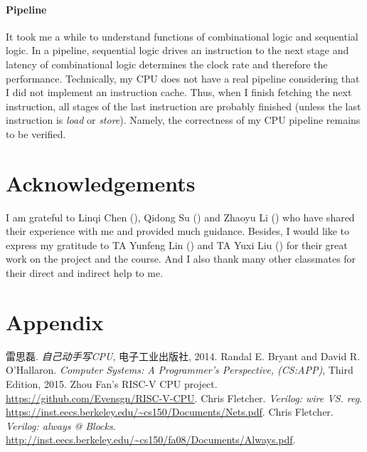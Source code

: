 \documentclass[12pt, a4paper]{article}
\begin{document}
\paragraph{Pipeline}
It took me a while to understand functions of combinational logic and sequential logic. In a pipeline, sequential logic drives an instruction to the next stage and latency of combinational logic determines the clock rate and therefore the performance. Technically, my CPU does not have a real pipeline considering that I did not implement an instruction cache. Thus, when I finish fetching the next instruction, all stages of the last instruction are probably finished (unless the last instruction is \textit{load} or \textit{store}). Namely, the correctness of my CPU pipeline remains to be verified.

\section{Acknowledgements}

I am grateful to Linqi Chen {()}, Qidong Su {()} and Zhaoyu Li {()} who have shared their experience with me and provided much guidance. Besides, I would like to express my gratitude to TA Yunfeng Lin {()} and TA Yuxi Liu {()} for their great work on the project and the course. And I also thank many other classmates for their direct and indirect help to me. 

\section{Appendix}

\begin{thebibliography}{9}
  	雷思磊.
  	\emph{自己动手写CPU},
  	电子工业出版社, 2014.
	Randal E. Bryant and David R. O'Hallaron.
	\emph{Computer Systems: A Programmer's Perspective, (CS:APP)},
	Third Edition, 2015.
  	Zhou Fan's RISC-V CPU project.
	\url{https://github.com/Evensgn/RISC-V-CPU}.
  	Chris Fletcher.
	  \emph{Verilog: wire VS. reg}.
	  \\\url{https://inst.eecs.berkeley.edu/~cs150/Documents/Nets.pdf}.
  	Chris Fletcher.
	  \emph{Verilog: always @ Blocks}.
	  \\\url{http://inst.eecs.berkeley.edu/~cs150/fa08/Documents/Always.pdf}.
  
\end{thebibliography}
\end{document}
